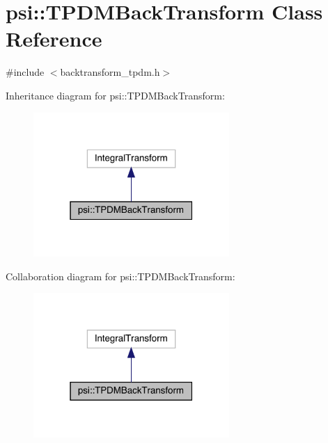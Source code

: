 \hypertarget{classpsi_1_1_t_p_d_m_back_transform}{}\section{psi\+:\+:T\+P\+D\+M\+Back\+Transform Class Reference}
\label{classpsi_1_1_t_p_d_m_back_transform}


{\ttfamily \#include $<$backtransform\+\_\+tpdm.\+h$>$}



Inheritance diagram for psi\+:\+:T\+P\+D\+M\+Back\+Transform\+:
\nopagebreak
\begin{figure}[H]
\begin{center}
\leavevmode
\includegraphics[width=211pt]{classpsi_1_1_t_p_d_m_back_transform__inherit__graph}
\end{center}
\end{figure}


Collaboration diagram for psi\+:\+:T\+P\+D\+M\+Back\+Transform\+:
\nopagebreak
\begin{figure}[H]
\begin{center}
\leavevmode
\includegraphics[width=211pt]{classpsi_1_1_t_p_d_m_back_transform__coll__graph}
\end{center}
\end{figure}
